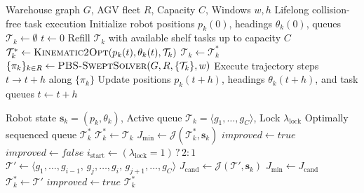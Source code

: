 \documentclass[journal]{IEEEtran}
\begin{document}
\begin{algorithm}[t]
\caption{Bi-Level Rolling-Horizon Lifelong Framework}
\label{alg:master_framework}
\begin{algorithmic}[1]
\REQUIRE Warehouse graph $G$, AGV fleet $R$, Capacity $C$, Windows $w, h$
\ENSURE Lifelong collision-free task execution
\STATE Initialize robot positions $p_k(0)$, headings $\theta_k(0)$, queues $\mathcal{T}_k \gets \emptyset$
\STATE $t \gets 0$
            \STATE Refill $\mathcal{T}_k$ with available shelf tasks up to capacity $C$
            \STATE $\mathcal{T}_k^* \gets \textsc{Kinematic2Opt}(p_k(t), \theta_k(t), \mathcal{T}_k)$ 
            \STATE $\mathcal{T}_k \gets \mathcal{T}_k^*$
        \ENDIF
    \ENDFOR
    \STATE $\{\pi_k\}_{k \in R} \gets \textsc{PBS-SweptSolver}(G, R, \{\mathcal{T}_k\}, w)$ 
    \STATE Execute trajectory steps $t \to t + h$ along $\{\pi_k\}$
    \STATE Update positions $p_k(t+h)$, headings $\theta_k(t+h)$, and task queues
    \STATE $t \gets t + h$
\ENDWHILE
\end{algorithmic}
\end{algorithm}

\begin{algorithm}[t]
\caption{Dynamic Kinematic Space-Time 2-Opt Goal Sequencing}
\label{alg:dynamic_2opt}
\begin{algorithmic}[1]
\REQUIRE Robot state $\mathbf{s}_k = (p_k, \theta_k)$, Active queue $\mathcal{T}_k = \langle g_1, \dots, g_C \rangle$, Lock $\lambda_{\text{lock}}$
\ENSURE Optimally sequenced queue $\mathcal{T}_k^*$
\STATE $\mathcal{T}_k^* \gets \mathcal{T}_k$
\STATE $J_{\min} \gets \mathcal{J}(\mathcal{T}_k^*, \mathbf{s}_k)$
\STATE $\mathit{improved} \gets \mathit{true}$
    \STATE $\mathit{improved} \gets \mathit{false}$
    \STATE $i_{\text{start}} \gets (\lambda_{\text{lock}} = 1) \mathbin{?} 2 : 1$
            \STATE $\mathcal{T}' \gets \langle g_1, \dots, g_{i-1}, \, g_j, \dots, g_i, \, g_{j+1}, \dots, g_C \rangle$
            \STATE $J_{\text{cand}} \gets \mathcal{J}(\mathcal{T}', \mathbf{s}_k)$
                \STATE $J_{\min} \gets J_{\text{cand}}$
                \STATE $\mathcal{T}_k^* \gets \mathcal{T}'$
                \STATE $\mathit{improved} \gets \mathit{true}$
            \ENDIF
        \ENDFOR
    \ENDFOR
\ENDWHILE
\RETURN $\mathcal{T}_k^*$
\end{algorithmic}
\end{algorithm}
\end{document}
